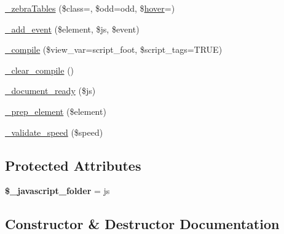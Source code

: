 \begin{DoxyCompactItemize}
\item 
\mbox{\hyperlink{class_c_i___jquery_ac9b29d1664fa4d3b3512eaec761e5279}{\+\_\+zebra\+Tables}} (\$class=\textquotesingle{}\textquotesingle{}, \$odd=\textquotesingle{}odd\textquotesingle{}, \$\mbox{\hyperlink{class_c_i___javascript_af109665fb707723bbb00f797b855a30e}{hover}}=\textquotesingle{}\textquotesingle{})
\item 
\mbox{\hyperlink{class_c_i___jquery_aa644f6a0ae103197e49aeeb2c7db2b4c}{\+\_\+add\+\_\+event}} (\$element, \$js, \$event)
\item 
\mbox{\hyperlink{class_c_i___jquery_aa60ab4af3f9b818b562c2df0dd789007}{\+\_\+compile}} (\$view\+\_\+var=\textquotesingle{}script\+\_\+foot\textquotesingle{}, \$script\+\_\+tags=T\+R\+UE)
\item 
\mbox{\hyperlink{class_c_i___jquery_a0668116916e1af87372f6d97b89e9b26}{\+\_\+clear\+\_\+compile}} ()
\item 
\mbox{\hyperlink{class_c_i___jquery_a356b9240d9d32d7a67dc998f4fa7ddda}{\+\_\+document\+\_\+ready}} (\$js)
\item 
\mbox{\hyperlink{class_c_i___jquery_ac0ef145ed0f3f9e722bfa93aafc86f97}{\+\_\+prep\+\_\+element}} (\$element)
\item 
\mbox{\hyperlink{class_c_i___jquery_afdc59a9703fdfb619202a211c7df5b8b}{\+\_\+validate\+\_\+speed}} (\$speed)
\end{DoxyCompactItemize}
\subsection*{Protected Attributes}
\begin{DoxyCompactItemize}
\item 
\mbox{\label{class_c_i___jquery_a2d2ddf69a98f25150013bcf64594aefe}} 
{\bfseries \$\+\_\+javascript\+\_\+folder} = \textquotesingle{}js\textquotesingle{}
\end{DoxyCompactItemize}


\subsection{Constructor \& Destructor Documentation}
\mbox{\label{class_c_i___jquery_a1d0af939f40979a61018fca28bd7e143}} 
